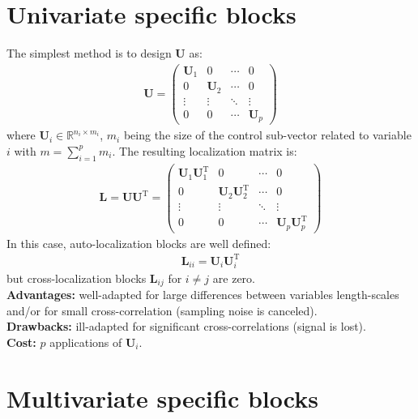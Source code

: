 \documentclass[12pt]{scrartcl}
\begin{document}
\section{Univariate specific blocks}
The simplest method is to design $\mathbf{U}$ as:
\begin{align}
\mathbf{U} = \left( \begin{array}{cccc}
\mathbf{U}_1 & 0 & \cdots & 0 \\
0 & \mathbf{U}_2 & \cdots & 0 \\
\vdots & \vdots & \ddots & \vdots \\
0 & 0 & \cdots & \mathbf{U}_p
\end{array} \right)
\end{align}
where $\mathbf{U}_i \in \mathbb{R}^{n_i \times m_i}$, $m_i$ being the size of the control sub-vector related to variable $i$ with $\displaystyle m = \sum_{i=1}^p m_i$. The resulting localization matrix is:
\begin{align}
\mathbf{L} = \mathbf{U} \mathbf{U}^\mathrm{T} = \left( \begin{array}{cccc}
\mathbf{U}_1 \mathbf{U}_1^\mathrm{T} & 0 & \cdots & 0 \\
0 & \mathbf{U}_2 \mathbf{U}_2^\mathrm{T} & \cdots & 0 \\
\vdots & \vdots & \ddots & \vdots \\
0 & 0 & \cdots & \mathbf{U}_p \mathbf{U}_p^\mathrm{T}
\end{array} \right)
\end{align}
In this case, auto-localization blocks are well defined:
\begin{align}
\mathbf{L}_{ii} = \mathbf{U}_i \mathbf{U}_i^\mathrm{T}
\end{align}
but cross-localization blocks $\mathbf{L}_{ij}$ for $i \ne j$ are zero.\\
$  $\\
\textbf{Advantages:} well-adapted for large differences between variables length-scales and/or for small cross-correlation (sampling noise is canceled).\\
\textbf{Drawbacks:} ill-adapted for significant cross-correlations (signal is lost).\\
\textbf{Cost:} $p$ applications of $\mathbf{U}_i$.

\section{Multivariate specific blocks}
\end{document}
